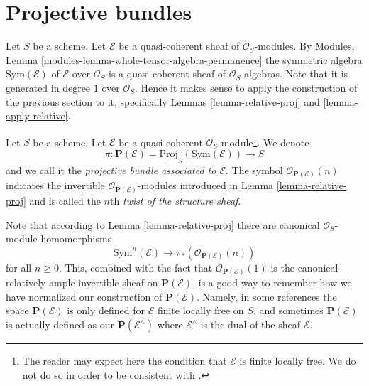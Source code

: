 \section{Projective bundles}
\label{section-projective-bundle}

\noindent
Let $S$ be a scheme.
Let $\mathcal{E}$ be a quasi-coherent sheaf of $\mathcal{O}_S$-modules.
By Modules, Lemma \ref{modules-lemma-whole-tensor-algebra-permanence}
the symmetric algebra $\text{Sym}(\mathcal{E})$ of
$\mathcal{E}$ over $\mathcal{O}_S$
is a quasi-coherent sheaf of $\mathcal{O}_S$-algebras.
Note that it is generated in degree $1$ over $\mathcal{O}_S$.
Hence it makes sense to apply the construction of the
previous section to it, specifically Lemmas
\ref{lemma-relative-proj} and \ref{lemma-apply-relative}.

\begin{definition}
\label{definition-projective-bundle}
Let $S$ be a scheme. Let $\mathcal{E}$ be a quasi-coherent
$\mathcal{O}_S$-module\footnote{The reader may expect here
the condition that $\mathcal{E}$ is finite locally free. We do not
do so in order to be consistent with
\cite[II, Definition 4.1.1]{EGA}.}.
We denote
$$
\pi :
\mathbf{P}(\mathcal{E}) = \underline{\text{Proj}}_S(\text{Sym}(\mathcal{E}))
\longrightarrow
S
$$
and we call it the {\it projective bundle associated to $\mathcal{E}$}.
The symbol $\mathcal{O}_{\mathbf{P}(\mathcal{E})}(n)$
indicates the invertible $\mathcal{O}_{\mathbf{P}(\mathcal{E})}$-modules
introduced in Lemma \ref{lemma-relative-proj} and is called the $n$th
{\it twist of the structure sheaf}.
\end{definition}

\noindent
Note that according to Lemma \ref{lemma-relative-proj} there are canonical
$\mathcal{O}_S$-module homomorphisms
$$
\text{Sym}^n(\mathcal{E})
\longrightarrow
\pi_*(\mathcal{O}_{\mathbf{P}(\mathcal{E})}(n))
$$
for all $n \geq 0$. This, combined with the fact that
$\mathcal{O}_{\mathbf{P}(\mathcal{E})}(1)$ is the canonical
relatively ample invertible sheaf on $\mathbf{P}(\mathcal{E})$,
is a good way to remember how we have normalized our
construction of $\mathbf{P}(\mathcal{E})$. Namely, in some references
the space $\mathbf{P}(\mathcal{E})$ is only defined for $\mathcal{E}$
finite locally free on $S$, and sometimes $\mathbf{P}(\mathcal{E})$
is actually defined as our $\mathbf{P}(\mathcal{E}^\wedge)$ where
$\mathcal{E}^\wedge$ is the dual of the sheaf $\mathcal{E}$.

